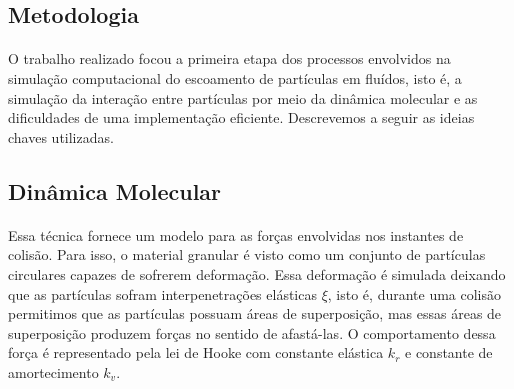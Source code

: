 \documentclass[a0,portrait]{a0poster}
\begin{document}
\begin{multicols}{2}
\color{DarkSlateGray} %



\section*{Metodologia}

\paragraph{}O trabalho realizado focou a primeira etapa dos processos
envolvidos na simulação computacional do escoamento de partículas em fluídos,
isto é, a simulação da interação entre partículas por meio da dinâmica
molecular e as dificuldades de uma implementação eficiente. Descrevemos a seguir
as ideias chaves utilizadas.
\subsection*{Dinâmica Molecular}
\paragraph{} Essa técnica fornece um modelo para as forças envolvidas nos
instantes de colisão. Para isso, o material granular é visto como um conjunto
de partículas circulares capazes de sofrerem deformação. Essa deformação é
simulada deixando que as partículas sofram interpenetrações elásticas $ \xi $,
isto é,
durante uma colisão permitimos que as partículas possuam áreas de superposição,
mas essas áreas de superposição produzem forças no sentido de afastá-las. O
comportamento dessa força é representado pela lei de Hooke com constante 
elástica $k_{r}$ e constante de amortecimento $k_{v}$.

\vspace{-2cm}
\begin{minipage}{0.25\textwidth}

\end{minipage}
\end{multicols}
\end{document}
